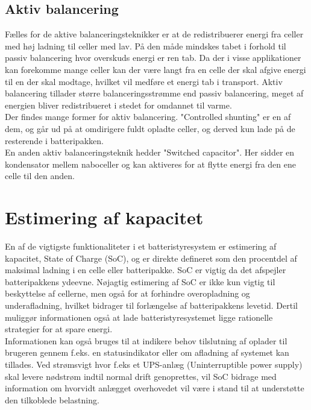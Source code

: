 \subsection{Aktiv balancering}
Fælles for de aktive balanceringsteknikker er at de redistribuerer energi fra celler med høj ladning til celler med lav. På den måde mindskes tabet i forhold til passiv balancering hvor overskuds energi er ren tab. Da der i visse applikationer kan forekomme mange celler kan der være langt fra en celle der skal afgive energi til en der skal modtage, hvilket vil medføre et energi tab i transport. Aktiv balancering tillader større balanceringsstrømme end passiv balancering, meget af energien bliver redistribueret i stedet for omdannet til varme.
\\

Der findes mange former for aktiv balancering. "Controlled shunting" er en af dem, og går ud på at omdirigere fuldt opladte celler, og derved kun lade på de resterende i batteripakken.
\\

En anden aktiv balanceringsteknik hedder "Switched capacitor". Her sidder en kondensator mellem naboceller og kan aktiveres for at flytte energi fra den ene celle til den anden.

\section{Estimering af kapacitet}
En af de vigtigste funktionaliteter i et batteristyresystem er estimering af kapacitet, State of Charge (SoC), og er direkte defineret som den procentdel af maksimal ladning i en celle eller batteripakke. SoC er vigtig da det afspejler batteripakkens ydeevne. Nøjagtig estimering af SoC er ikke kun vigtig til beskyttelse af cellerne, men også for at forhindre overopladning og underafladning, hvilket bidrager til forlængelse af batteripakkens levetid. Dertil muliggør informationen også at lade batteristyresystemet ligge rationelle strategier for at spare energi. \\

Informationen kan også bruges til at indikere behov tilslutning af oplader til brugeren gennem f.eks. en statusindikator eller om afladning af systemet kan tillades. 
Ved strømsvigt hvor f.eks et UPS-anlæg (Uninterruptible power supply) skal levere nødstrøm indtil normal drift genoprettes, vil SoC bidrage med information om hvorvidt anlægget overhovedet vil være i stand til at understøtte den tilkoblede belastning. \\

